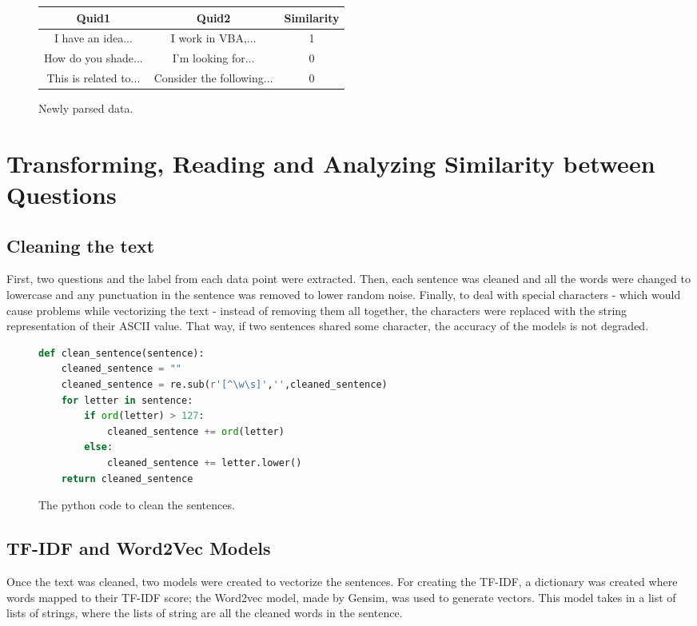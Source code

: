 \documentclass[9pt,twocolumn,twoside]{idsi}
\begin{document}
\begin{figure}[h!]
\begin{center}
\begin{tabular}{ |c|c|c| }
 \hline
 Quid1 & Quid2 & Similarity\\
 \hline
 I have an idea... & I work in VBA,... & 1 \\
 How do you shade... & I'm looking for... & 0\\
 This is related to... & Consider the following... & 0 \\
 \hline
\end{tabular}
\end{center}
\caption{Newly parsed data.}
\end{figure}

\section{Transforming, Reading and Analyzing Similarity between Questions}
\subsection{Cleaning the text}
First, two questions and the label from each data point were extracted. Then, each sentence was cleaned and all the words were changed to lowercase and any punctuation in the sentence was removed to lower random noise. Finally, to deal with  special characters - which would cause problems while vectorizing the text - instead of removing them all together, the characters were replaced with the string representation of their ASCII value. That way, if two sentences shared some character, the accuracy of the models is not degraded.

\begin{figure}[h!]
\begin{lstlisting}[language=python]
def clean_sentence(sentence):
    cleaned_sentence = ""
    cleaned_sentence = re.sub(r'[^\w\s]','',cleaned_sentence)
    for letter in sentence:
        if ord(letter) > 127:
            cleaned_sentence += ord(letter)
        else:
            cleaned_sentence += letter.lower()
    return cleaned_sentence

\end{lstlisting}
\caption{The python code to clean the sentences.}
\end{figure}

\subsection{TF-IDF and Word2Vec Models}
Once the text was cleaned, two models were created to vectorize the sentences. For creating the TF-IDF, a dictionary was created where words mapped to their TF-IDF score; the Word2vec model, made by Gensim, was used to generate vectors. This model takes in a list of lists of strings, where the lists of string are all the cleaned words in the sentence.
\end{document}
